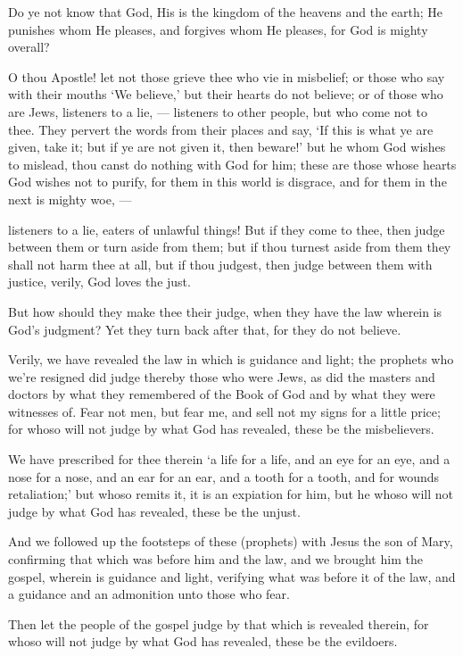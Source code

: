 \documentclass[fontsize=14pt, letterpaper, notitlepage, openany, DIV=12]{scrbook} %
\begin{document}
\noindent[5:40]
Do ye not know that God, His is the kingdom of the heavens and the earth; He punishes
whom He pleases, and forgives whom He pleases, for God is mighty overall?

\noindent[5:41]
O thou Apostle! let not those grieve thee who vie in misbelief; or those who say with
their mouths `We believe,' but their hearts do not believe; or of those who are Jews, listeners to a
lie, --- listeners to other people, but who come not to thee. They pervert the words from their
places and say, `If this is what ye are given, take it; but if ye are not given it, then beware!' but
he whom God wishes to mislead, thou canst do nothing with God for him; these are those whose
hearts God wishes not to purify, for them in this world is disgrace, and for them in the next is
mighty woe, ---

\noindent[5:42]
listeners to a lie, eaters of unlawful things! But if they come to thee, then judge between
them or turn aside from them; but if thou turnest aside from them they shall not harm thee at all,
but if thou judgest, then judge between them with justice, verily, God loves the just.

\noindent[5:43]
But how should they make thee their judge, when they have the law wherein is God's
judgment? Yet they turn back after that, for they do not believe.

\noindent[5:44]
Verily, we have revealed the law in which is guidance and light; the prophets who we're
resigned did judge thereby those who were Jews, as did the masters and doctors by what they
remembered of the Book of God and by what they were witnesses of. Fear not men, but fear me,
and sell not my signs for a little price; for whoso will not judge by what God has revealed, these
be the misbelievers.

\noindent[5:45]
We have prescribed for thee therein `a life for a life, and an eye for an eye, and a nose for
a nose, and an ear for an ear, and a tooth for a tooth, and for wounds retaliation;' but whoso
remits it, it is an expiation for him, but he whoso will not judge by what God has revealed, these
be the unjust.

\noindent[5:46]
And we followed up the footsteps of these (prophets) with Jesus the son of Mary,
confirming that which was before him and the law, and we brought him the gospel, wherein is
guidance and light, verifying what was before it of the law, and a guidance and an admonition
unto those who fear.

\noindent[5:47]
Then let the people of the gospel judge by that which is revealed therein, for whoso will
not judge by what God has revealed, these be the evildoers.
\end{document}

